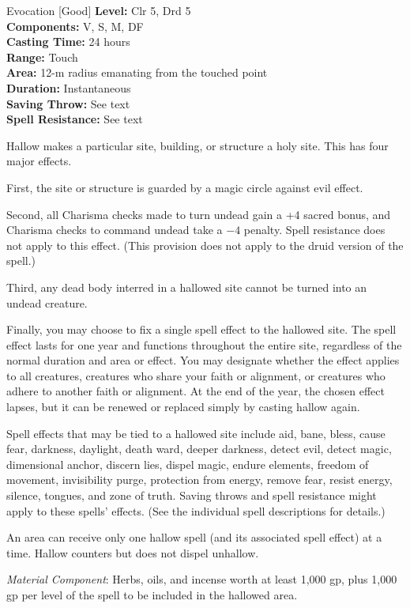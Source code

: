 {Evocation [Good]}
{
	\textbf{Level:}
	Clr 5, Drd 5\\
	\textbf{Components:}
	V, S, M, DF\\
	\textbf{Casting Time:}
	24 hours\\
	\textbf{Range:}
	Touch\\
	\textbf{Area:}
	12-m radius emanating from the touched point\\
	\textbf{Duration:}
	Instantaneous\\
	\textbf{Saving Throw:}
	See text\\
	\textbf{Spell Resistance:}
	See text\\
}
{
	Hallow makes a particular site, building, or structure a holy site. This has four major effects.

	First, the site or structure is guarded by a magic circle against evil effect.

	Second, all Charisma checks made to turn undead gain a +4 sacred bonus, and Charisma checks to command undead take a $-4$ penalty. Spell resistance does not apply to this effect. (This provision does not apply to the druid version of the spell.)

	Third, any dead body interred in a hallowed site cannot be turned into an undead creature.

	Finally, you may choose to fix a single spell effect to the hallowed site. The spell effect lasts for one year and functions throughout the entire site, regardless of the normal duration and area or effect. You may designate whether the effect applies to all creatures, creatures who share your faith or alignment, or creatures who adhere to another faith or alignment. At the end of the year, the chosen effect lapses, but it can be renewed or replaced simply by casting hallow again.

	Spell effects that may be tied to a hallowed site include aid, bane, bless, cause fear, darkness, daylight, death ward, deeper darkness, detect evil, detect magic, dimensional anchor, discern lies, dispel magic, endure elements, freedom of movement, invisibility purge, protection from energy, remove fear, resist energy, silence, tongues, and zone of truth. Saving throws and spell resistance might apply to these spells' effects. (See the individual spell descriptions for details.)

	An area can receive only one hallow spell (and its associated spell effect) at a time. Hallow counters but does not dispel unhallow.

	\textit{Material Component}:
	Herbs, oils, and incense worth at least 1,000 gp, plus 1,000 gp per level of the spell to be included in the hallowed area.

}
